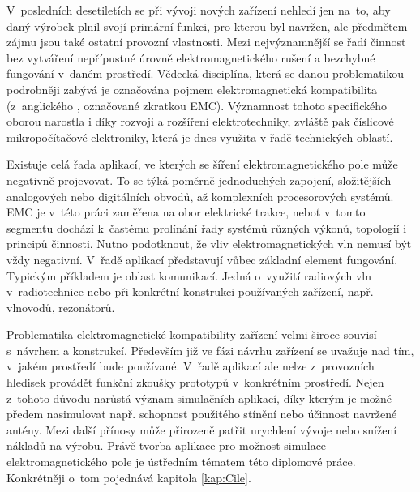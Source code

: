 
V~posledních desetiletích se při vývoji nových zařízení nehledí jen na~to, aby daný výrobek plnil svojí primární funkci, pro kterou byl navržen, ale předmětem zájmu jsou také ostatní provozní vlastnosti. Mezi nejvýznamnější se řadí činnost bez vytváření nepřípustné úrovně elektromagnetického rušení a bezchybné fungování v~daném prostředí. Vědecká disciplína, která se danou problematikou podrobněji zabývá je označována pojmem elektromagnetická kompatibilita (z~anglického , označované zkratkou EMC). Významnost tohoto specifického oborou narostla i díky rozvoji a rozšíření elektrotechniky, zvláště pak číslicové mikropočítačové elektroniky, která je dnes využita v řadě technických oblastí.

Existuje celá řada aplikací, ve kterých se šíření elektromagnetického pole může negativně projevovat. To se týká poměrně jednoduchých zapojení, složitějších analogových nebo digitálních obvodů, až komplexních procesorových systémů. EMC je v~této práci zaměřena na obor elektrické trakce, neboť v~tomto segmentu dochází k~častému prolínání řady systémů různých výkonů, topologií i principů činnosti. Nutno podotknout, že vliv elektromagnetických vln nemusí být vždy negativní. V~řadě aplikací představují vůbec základní element fungování. Typickým příkladem je oblast komunikací. Jedná o~využití radiových vln v~radiotechnice nebo při konkrétní konstrukci používaných zařízení, např. vlnovodů, rezonátorů.

Problematika elektromagnetické kompatibility zařízení velmi široce souvisí s~návrhem a konstrukcí. Především již ve fázi návrhu zařízení se uvažuje nad tím, v~jakém prostředí bude používané. V~řadě aplikací ale nelze z~provozních hledisek provádět funkční zkoušky prototypů v~konkrétním prostředí. Nejen z~tohoto důvodu narůstá význam simulačních aplikací, díky kterým je možné předem nasimulovat např. schopnost použitého stínění nebo účinnost navržené antény. Mezi další přínosy může přirozeně patřit urychlení vývoje nebo snížení nákladů na výrobu. Právě tvorba aplikace pro možnost simulace elektromagnetického pole je ústředním tématem této diplomové práce. Konkrétněji o~tom pojednává kapitola \ref{kap:Cile}.

